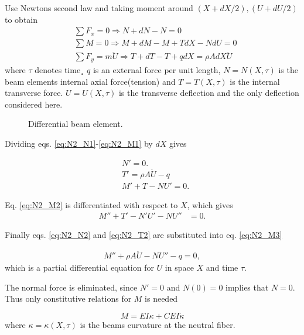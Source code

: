 Use Newtons second law and taking moment around $(X+dX/2),(U+dU/2)$ to obtain
\begin{align}
  \label{eq:N2_N1}&\sum F_{x} = 0 \Rightarrow N+dN-N=0 \\
  \label{eq:N2_M1}&\sum M = 0 \Rightarrow M+dM-M+TdX-NdU=0 \\
  \label{eq:N2_T1}&\sum F_{y} = m \ddot U \Rightarrow
                    T+dT-T + q dX = \rho A dX \ddot U
\end{align}
where $\tau$ denotes time¸ $q$ is an external force per unit length,
$N=N(X,\tau)$ is the beam elements internal axial force(tension) and
$T=T(X,\tau)$ is the internal transverse force. $U=U(X,\tau)$ is the transverse
deflection and the only deflection considered here.


\begin{figure}[!ht]
  \centering
  \resizebox{0.45\textwidth}{!}{}
  \caption{Differential beam element.}
\label{fig:beam_element}
\end{figure}

Dividing eqs. \eqref{eq:N2_N1}-\eqref{eq:N2_M1} by $dX$ gives

\begin{align}
  \label{eq:N2_N2}&N'=0.\\
  \label{eq:N2_T2}&T'= \rho A \ddot U - q \\
  \label{eq:N2_M2}&M'+T-NU'=0.
\end{align}

Eq. \eqref{eq:N2_M2} is differentiated with respect to $X$, which gives
\begin{align}
  \label{eq:N2_M3}M''+T'-N'U'-NU''&=0.
\end{align}

Finally eqs. \eqref{eq:N2_N2} and \eqref{eq:N2_T2} are substituted into
eq. \eqref{eq:N2_M3}

\begin{align}
  \label{eq:N2_M3_2} M'' + \rho A \ddot U - NU'' -q = 0,
\end{align}
which is a partial differential equation for $U$ in space $X$ and time $\tau$.


The normal force is eliminated, since $N' = 0$ and $N(0) = 0$ implies that
$N=0$. Thus only constitutive relations for $M$ is needed

\begin{equation}
  \label{eq:constitute_M}
  M = EI\kappa + CEI\dot\kappa
\end{equation}
where $\kappa = \kappa(X, \tau)$ is the beams curvature at the neutral fiber.

